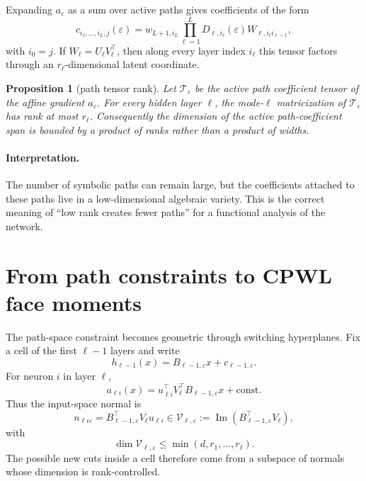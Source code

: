 \documentclass[10pt,twocolumn]{article}
\newtheorem{proposition}{Proposition}
\newcommand{\1}{\mathbf{1}}
\newcommand{\im}{\operatorname{Im}}
\newcommand{\cV}{\mathcal{V}}
\begin{document}
Expanding $a_\varepsilon$ as a sum over active paths gives coefficients of the form
\begin{equation}
 c_{i_1,\ldots,i_L,j}(\varepsilon)=w_{L+1,i_L}\prod_{\ell=1}^L D_{\ell,i_\ell}(\varepsilon) W_{\ell,i_\ell i_{\ell-1}},
\end{equation}
with $i_0=j$.  If $W_\ell=U_\ell V_\ell^\top$, then along every layer index $i_\ell$ this tensor factors through an $r_\ell$-dimensional latent coordinate.

\begin{proposition}[path tensor rank]
Let $\mathcal{T}_\varepsilon$ be the active path coefficient tensor of the affine gradient $a_\varepsilon$.  For every hidden layer $\ell$, the mode-$\ell$ matricization of $\mathcal{T}_\varepsilon$ has rank at most $r_\ell$.  Consequently the dimension of the active path-coefficient span is bounded by a product of ranks rather than a product of widths.
\end{proposition}

\paragraph{Interpretation.}
The number of symbolic paths can remain large, but the coefficients attached to these paths live in a low-dimensional algebraic variety.  This is the correct meaning of ``low rank creates fewer paths'' for a functional analysis of the network.

\section{From path constraints to CPWL face moments}
The path-space constraint becomes geometric through switching hyperplanes.  Fix a cell of the first $\ell-1$ layers and write
\begin{equation}
 h_{\ell-1}(x)=B_{\ell-1,\varepsilon}x+c_{\ell-1,\varepsilon}.
\end{equation}
For neuron $i$ in layer $\ell$,
\begin{equation}
 a_{\ell i}(x)=u_{\ell i}^\top V_\ell^\top B_{\ell-1,\varepsilon}x+\mathrm{const.}
\end{equation}
Thus the input-space normal is
\begin{equation}
 n_{\ell i\varepsilon}=B_{\ell-1,\varepsilon}^\top V_\ell u_{\ell i}
 \in \cV_{\ell,\varepsilon}:=\im(B_{\ell-1,\varepsilon}^\top V_\ell),
\end{equation}
with
\begin{equation}
 \dim \cV_{\ell,\varepsilon}\le \min(d,r_1,\ldots,r_\ell).
\end{equation}
The possible new cuts inside a cell therefore come from a subspace of normals whose dimension is rank-controlled.
\end{document}

